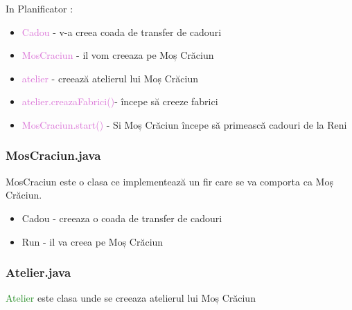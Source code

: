 \documentclass{article}
\begin{document}
In Planificator  :
\begin{itemize}
\item \textcolor{Orchid}{Cadou} - v-a creea coada de transfer de cadouri
\item \textcolor{Orchid}{MosCraciun} - il vom creeaza pe Moș Crăciun
\item \textcolor{Orchid}{atelier} - creează atelierul lui Moș Crăciun
\item \textcolor{Orchid}{atelier.creazaFabrici()}- începe să creeze fabrici
\item \textcolor{Orchid}{MosCraciun.start()} - Si Moș Crăciun începe să primească cadouri de la Reni
\end{itemize}

\subsubsection{\textcolor{Periwinkle}{MosCraciun.java}}
\textcolor{BrickRed}{MosCraciun} este  o clasa ce implementează un fir care se va comporta ca Moș Crăciun.


 
\begin{itemize}
\item \textcolor{Bittersweet}{Cadou} - creeaza o coada de transfer de cadouri
\item  \textcolor{Bittersweet}{Run}  - il va creea pe Moș Crăciun
\end{itemize}


\subsubsection{\textcolor{Periwinkle}{Atelier.java}}
\textcolor{ForestGreen}{Atelier} este clasa unde se creeaza atelierul lui Moș Crăciun
\end{document}
